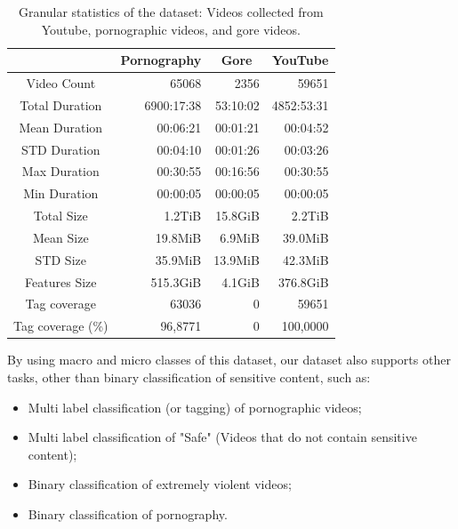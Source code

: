\begin{table}
\centering
\caption{Granular statistics of the dataset: Videos collected from Youtube, pornographic videos, and gore videos.}
\begin{tabular}{c|r|r|r} 
\multicolumn{1}{l|}{} & \multicolumn{1}{c|}{Pornography} & \multicolumn{1}{c|}{Gore} & \multicolumn{1}{c}{YouTube}  \\ 
\hline
Video Count           & 65068                     & 2356                      & 59651                         \\ 
\hline
Total Duration        & 6900:17:38                & 53:10:02                  & 4852:53:31                    \\ 
\hline
Mean Duration         & 00:06:21                  & 00:01:21                  & 00:04:52                      \\ 
\hline
STD Duration          & 00:04:10                  & 00:01:26                  & 00:03:26                      \\ 
\hline
Max Duration          & 00:30:55                  & 00:16:56                  & 00:30:55                      \\ 
\hline
Min Duration          & 00:00:05                  & 00:00:05                  & 00:00:05                      \\ 
\hline
Total Size            & 1.2TiB                    & 15.8GiB                   & 2.2TiB                        \\ 
\hline
Mean Size             & 19.8MiB                   & 6.9MiB                    & 39.0MiB                       \\ 
\hline
STD Size              & 35.9MiB                   & 13.9MiB                   & 42.3MiB                       \\ 
\hline
Features Size         & 515.3GiB                  & 4.1GiB                    & 376.8GiB                      \\ 
\hline
Tag coverage          & 63036                     & 0                      & 59651                         \\ 
\hline
Tag coverage (\%)     & 96,8771                   & 0                  & 100,0000                       \\
\end{tabular}
\label{tab:granular-stats}
\end{table}

By using macro and micro classes of this dataset, our dataset  also supports other tasks, other than binary classification of sensitive content, such as:
\begin{itemize}
    \item Multi label classification (or tagging) of pornographic videos;
    \item Multi label classification of "Safe" (Videos that do not contain sensitive content);
    \item Binary classification of extremely violent videos;
    \item Binary classification of pornography.
\end{itemize}


